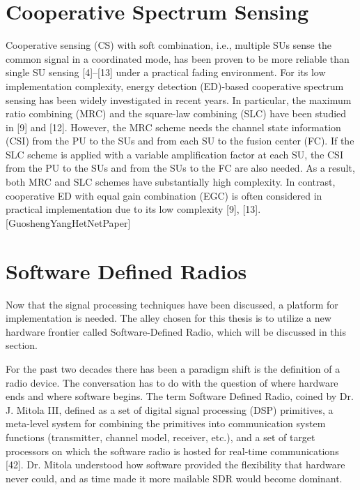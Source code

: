 \section{Cooperative Spectrum Sensing}
Cooperative sensing (CS) with soft combination, i.e., multiple SUs sense the common signal in a coordinated mode,
has been proven to be more reliable than single SU sensing [4]–[13] under a practical fading environment. For its low
implementation complexity, energy detection (ED)-based cooperative spectrum sensing has been widely investigated in recent
years. In particular, the maximum ratio combining (MRC) and the square-law combining (SLC) have been studied in [9]
and [12]. However, the MRC scheme needs the channel state information (CSI) from the PU to the SUs and from each SU
to the fusion center (FC). If the SLC scheme is applied with a variable amplification factor at each SU, the CSI from the PU
to the SUs and from the SUs to the FC are also needed. As a result, both MRC and SLC schemes have substantially high
complexity. In contrast, cooperative ED with equal gain combination (EGC) is often considered in practical implementation
due to its low complexity [9], [13].[GuoshengYangHetNetPaper]


\section{Software Defined Radios}
Now that the signal processing techniques have been discussed, a platform for implementation is needed. The alley chosen for this thesis is to utilize a new hardware frontier
called Software-Defined Radio, which will be discussed in this section.

For the past two decades there has been a paradigm shift is the definition of a radio device. The conversation has to do with the question of where hardware ends and where
software begins. The term Software Defined Radio, coined by Dr. J. Mitola III, defined as a set of digital signal processing (DSP) primitives, a meta-level system for combining
the primitives into communication system functions (transmitter, channel model, receiver, etc.), and a set of target processors on which the software radio is hosted for real-time
communications [42]. Dr. Mitola understood how software provided the flexibility that hardware never could, and as time made it more mailable SDR would become dominant.

